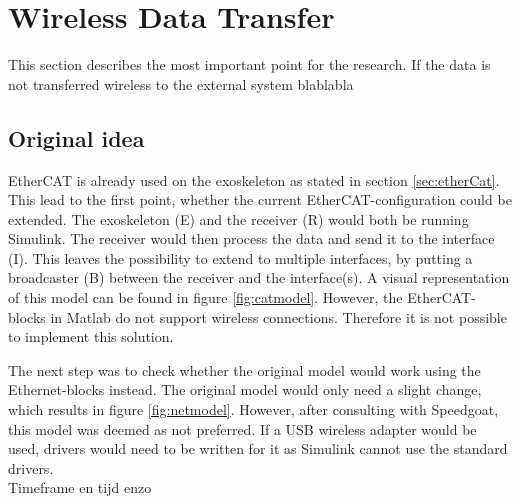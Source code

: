 \section{Wireless Data Transfer}\label{sec:datatrans}
This section describes the most important point for the research. If the data is not transferred wireless to the external system blablabla

\subsection{Original idea}
EtherCAT is already used on the exoskeleton as stated in section \ref{sec:etherCat}. This lead to the first point, whether the current EtherCAT-configuration could be extended. The exoskeleton (E) and the receiver (R) would both be running Simulink. The receiver would then process the data and send it to the interface (I). This leaves the possibility to  extend to multiple interfaces, by putting a broadcaster (B) between the receiver and the interface(s). A visual representation of this model can be found in figure \ref{fig:catmodel}. However, the EtherCAT-blocks in Matlab \cite{web:ethercat} do not support wireless connections. Therefore it is not possible to implement this solution.

The next step was to check whether the original model would work using the Ethernet-blocks \cite{web:ethernet} instead. The original model would only need a slight change, which results in figure \ref{fig:netmodel}. However, after consulting with Speedgoat, this model was deemed as not preferred. If a USB wireless adapter would be used, drivers would need to be written for it as Simulink cannot use the standard drivers.\\
Timeframe en tijd enzo\\

